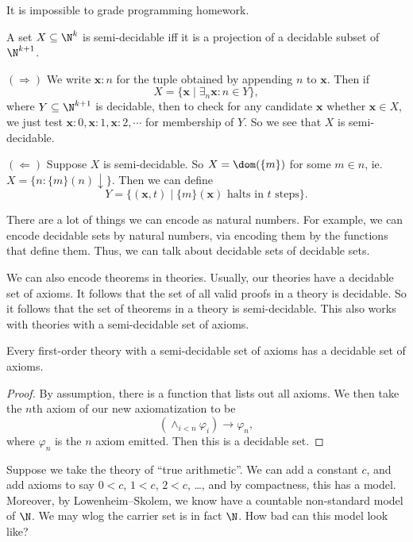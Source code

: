 \documentclass[a4paper]{article}
\begin{document}
\begin{cor}
  It is impossible to grade programming homework.
\end{cor}

\begin{prop}
  A set $X \subseteq \N^k$ is semi-decidable iff it is a projection of a decidable subset of $\N^{k + 1}$.
\end{prop}

\begin{prop}
  $(\Rightarrow)$ We write $\mathbf{x}:n$ for the tuple obtained by appending $n$ to $\mathbf{x}$. Then if
  \[
    X = \{\mathbf{x} \mid \exists_n \mathbf{x}:n\in Y\},
  \]
  where $Y \subseteq \N^{k + 1}$ is decidable, then to check for any candidate $\mathbf{x}$ whether $\mathbf{x} \in X$, we just test $\mathbf{x}:0, \mathbf{x}:1, \mathbf{x}:2, \cdots$ for membership of $Y$. So we see that $X$ is semi-decidable.

  $(\Leftarrow)$ Suppose $X$ is semi-decidable. So $X = \dom(\{m\})$ for some $m \in n$, ie. $X = \{n: \{m\}(n) \downarrow\}$. Then we can define
  \[
    Y = \{(\mathbf{x}, t) \mid \{m\}(\mathbf{x})\text{ halts in $t$ steps}\}.
  \]
\end{prop}
There are a lot of things we can encode as natural numbers. For example, we can encode decidable sets by natural numbers, via encoding them by the functions that define them. Thus, we can talk about decidable sets of decidable sets.

We can also encode theorems in theories. Usually, our theories have a decidable set of axioms. It follows that the set of all valid proofs in a theory is decidable. So it follows that the set of theorems in a theory is semi-decidable. This also works with theories with a semi-decidable set of axioms.

\begin{thm}
  Every first-order theory with a semi-decidable set of axioms has a decidable set of axioms.
\end{thm}

\begin{proof}
  By assumption, there is a function that lists out all axioms. We then take the $n$th axiom of our new axiomatization to be
  \[
    \left(\wedge_{i < n} \varphi_i\right) \to \varphi_n,
  \]
  where $\varphi_n$ is the $n$ axiom emitted. Then this is a decidable set.
\end{proof}

Suppose we take the theory of ``true arithmetic''. We can add a constant $c$, and add axioms to say $0 < c$, $1 < c$, $2 < c$, \ldots, and by compactness, this has a model. Moreover, by Lowenheim--Skolem, we know have a countable non-standard model of $\N$. We may wlog the carrier set is in fact $\N$. How bad can this model look like?
\end{document}
